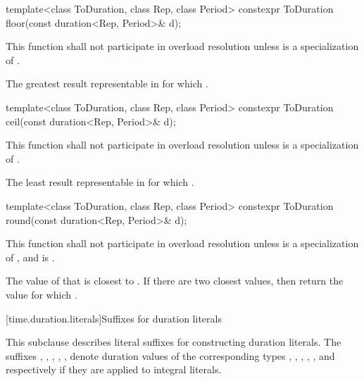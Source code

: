 %
\begin{itemdecl}
template<class ToDuration, class Rep, class Period>
  constexpr ToDuration floor(const duration<Rep, Period>& d);
\end{itemdecl}

\begin{itemdescr}
\pnum
\remarks This function shall not participate in overload resolution
unless  is a specialization of .

\pnum
\returns The greatest result  representable in 
for which .
\end{itemdescr}

%
\begin{itemdecl}
template<class ToDuration, class Rep, class Period>
  constexpr ToDuration ceil(const duration<Rep, Period>& d);
\end{itemdecl}

\begin{itemdescr}
\pnum
\remarks This function shall not participate in overload resolution
unless  is a specialization of .

\pnum
\returns The least result  representable in 
for which .
\end{itemdescr}

%
\begin{itemdecl}
template<class ToDuration, class Rep, class Period>
  constexpr ToDuration round(const duration<Rep, Period>& d);
\end{itemdecl}

\begin{itemdescr}
\pnum
\remarks This function shall not participate in overload resolution
unless  is a specialization of ,
and 
is .

\pnum
\returns The value of  that is closest to .
If there are two closest values, then return the value 
for which .
\end{itemdescr}

[time.duration.literals]{Suffixes for duration literals}

\pnum
This subclause describes literal suffixes for constructing duration literals. The
suffixes , , , , , 
denote duration values of the corresponding types , ,
, , , and 
respectively if they are applied to integral literals.

